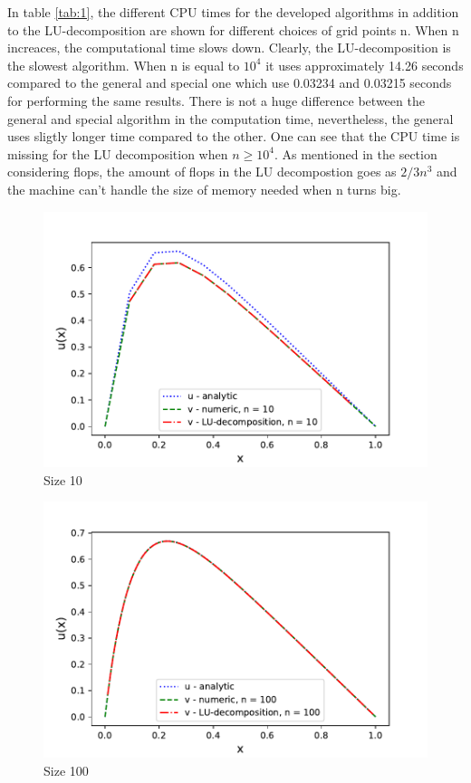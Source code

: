 \documentclass{article}
\begin{document}
In  table \ref{tab:1}, the different CPU times for the developed algorithms in addition to the LU-decomposition are shown for different choices of grid points n. When n increaces, the computational time slows down. Clearly, the LU-decomposition is the slowest algorithm. When n is equal to $10^4$ it uses approximately 14.26 seconds compared to the general and special one which use 0.03234 and 0.03215 seconds for performing the same results. There is not a huge difference between the general and special algorithm in the computation time, nevertheless, the general uses sligtly longer time compared to the other.  One can see that the CPU time is missing for the LU decomposition when $n \geqslant 10^4$. As mentioned in the section considering flops, the amount of flops in the LU decompostion goes as $2/3n^3$ and the machine can't handle the size of memory needed when n turns big. 


\begin{figure}[h]
    \centering
    \includegraphics[width =12cm]{python/size_10.pdf}
    \caption{Size 10}
    \label{fig:1}
\end{figure}

\begin{figure}[h]
    \centering
    \includegraphics[width =12cm]{python/size_100.pdf}
    \caption{Size 100}
    \label{fig:2}
\end{figure}
\end{document}
